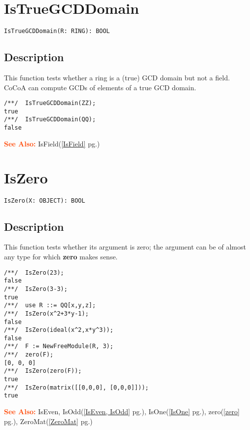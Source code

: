 \documentclass[a4paper]{mybook}
\newenvironment{command}{}{} %
\newcommand\SeeAlso{\par\textcolor{OrangeRed}{\textbf{\large See Also: }}}
\begin{document}
\section{IsTrueGCDDomain}
\label{IsTrueGCDDomain}
\begin{command} %


\begin{Verbatim}[label=syntax, rulecolor=\color{MidnightBlue},
frame=single]
IsTrueGCDDomain(R: RING): BOOL
\end{Verbatim}


\subsection*{Description}

This function tests whether a ring is a (true) GCD domain but not a field.
CoCoA can compute GCDs of elements of a true GCD domain.
\begin{Verbatim}[label=example, rulecolor=\color{PineGreen}, frame=single]
/**/  IsTrueGCDDomain(ZZ);
true
/**/  IsTrueGCDDomain(QQ);
false
\end{Verbatim}


\SeeAlso %
  IsField(\ref{IsField} pg.\pageref{IsField})
\end{command} %

\section{IsZero}
\label{IsZero}
\begin{command} %


\begin{Verbatim}[label=syntax, rulecolor=\color{MidnightBlue},
frame=single]
IsZero(X: OBJECT): BOOL
\end{Verbatim}


\subsection*{Description}

This function tests whether its argument is zero; the argument can be
of almost any type for which \textbf{zero} makes sense.
\begin{Verbatim}[label=example, rulecolor=\color{PineGreen}, frame=single]
/**/  IsZero(23);
false
/**/  IsZero(3-3);
true
/**/  use R ::= QQ[x,y,z];
/**/  IsZero(x^2+3*y-1);
false
/**/  IsZero(ideal(x^2,x*y^3));
false
/**/  F := NewFreeModule(R, 3);
/**/  zero(F);
[0, 0, 0]
/**/  IsZero(zero(F));
true
/**/  IsZero(matrix([[0,0,0], [0,0,0]]));
true
\end{Verbatim}


\SeeAlso %
  IsEven, IsOdd(\ref{IsEven, IsOdd} pg.\pageref{IsEven, IsOdd}), 
    IsOne(\ref{IsOne} pg.\pageref{IsOne}), 
    zero(\ref{zero} pg.\pageref{zero}), 
    ZeroMat(\ref{ZeroMat} pg.\pageref{ZeroMat})
\end{command} %
\end{document}
